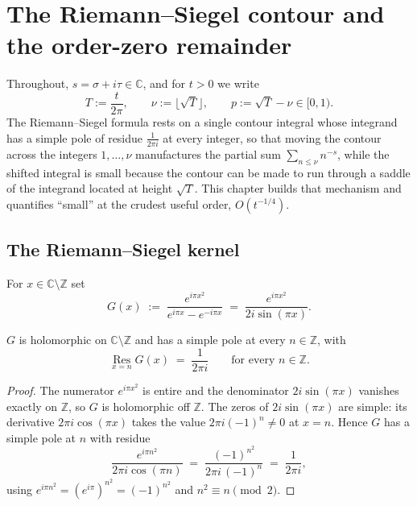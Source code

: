 %

\chapter{The Riemann--Siegel contour and the order-zero remainder}
\label{cha:riemann_siegel}

Throughout, $s=\sigma+i\tau\in\mathbb{C}$, and for $t>0$ we write
\[
  T:=\frac{t}{2\pi},\qquad \nu:=\lfloor\sqrt{T}\rfloor,\qquad p:=\sqrt{T}-\nu\in[0,1).
\]
The Riemann--Siegel formula rests on a single contour integral whose integrand has a
simple pole of residue $\tfrac1{2\pi i}$ at every integer, so that moving the contour
across the integers $1,\dots,\nu$ manufactures the partial sum $\sum_{n\le\nu}n^{-s}$,
while the shifted integral is small because the contour can be made to run through a
saddle of the integrand located at height $\sqrt{T}$.  This chapter builds that
mechanism and quantifies ``small'' at the crudest useful order, $O(t^{-1/4})$.

\section{The Riemann--Siegel kernel}
\label{sec:rs_kernel}

\begin{definition}
\label{def:rs_kernel}
\leanok
For $x\in\mathbb{C}\setminus\mathbb{Z}$ set
\[
  G(x)\;:=\;\frac{e^{i\pi x^{2}}}{e^{i\pi x}-e^{-i\pi x}}\;=\;\frac{e^{i\pi x^{2}}}{2i\sin(\pi x)} .
\]
\end{definition}

\begin{lemma}
\label{lem:rs_kernel_residue}
\leanok
{}
$G$ is holomorphic on $\mathbb{C}\setminus\mathbb{Z}$ and has a simple pole at every
$n\in\mathbb{Z}$, with
\[
  \operatorname*{Res}_{x=n}G(x)\;=\;\frac1{2\pi i}\qquad\text{for every }n\in\mathbb{Z}.
\]
\end{lemma}

\begin{proof}
\leanok
The numerator $e^{i\pi x^{2}}$ is entire and the denominator $2i\sin(\pi x)$ vanishes
exactly on $\mathbb{Z}$, so $G$ is holomorphic off $\mathbb{Z}$.  The zeros of
$2i\sin(\pi x)$ are simple: its derivative $2\pi i\cos(\pi x)$ takes the value
$2\pi i(-1)^{n}\ne0$ at $x=n$.  Hence $G$ has a simple pole at $n$ with residue
\[
  \frac{e^{i\pi n^{2}}}{2\pi i\cos(\pi n)}\;=\;\frac{(-1)^{n^{2}}}{2\pi i\,(-1)^{n}}
  \;=\;\frac1{2\pi i},
\]
using $e^{i\pi n^{2}}=(e^{i\pi})^{n^{2}}=(-1)^{n^{2}}$ and $n^{2}\equiv n\pmod 2$.
\end{proof}

